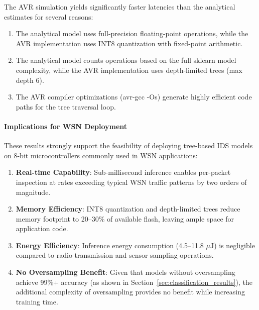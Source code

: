 The AVR simulation yields significantly faster latencies than the analytical estimates for several reasons:

\begin{enumerate}
    \item The analytical model uses full-precision floating-point operations, while the AVR implementation uses INT8 quantization with fixed-point arithmetic.
    \item The analytical model counts operations based on the full sklearn model complexity, while the AVR implementation uses depth-limited trees (max depth 6).
    \item The AVR compiler optimizations (avr-gcc -Os) generate highly efficient code paths for the tree traversal loop.
\end{enumerate}

\paragraph{Implications for WSN Deployment}

These results strongly support the feasibility of deploying tree-based IDS models on 8-bit microcontrollers commonly used in WSN applications:

\begin{enumerate}
    \item \textbf{Real-time Capability}: Sub-millisecond inference enables per-packet inspection at rates exceeding typical WSN traffic patterns by two orders of magnitude.
    
    \item \textbf{Memory Efficiency}: INT8 quantization and depth-limited trees reduce memory footprint to 20--30\% of available flash, leaving ample space for application code.
    
    \item \textbf{Energy Efficiency}: Inference energy consumption (4.5--11.8 $\mu$J) is negligible compared to radio transmission and sensor sampling operations.
    
    \item \textbf{No Oversampling Benefit}: Given that models without oversampling achieve 99\%+ accuracy (as shown in Section~\ref{sec:classification_results}), the additional complexity of oversampling provides no benefit while increasing training time.
\end{enumerate}
